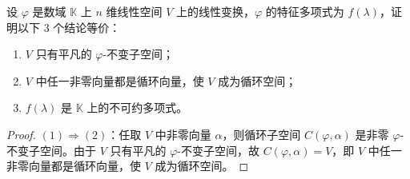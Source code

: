 \documentclass[../../main.tex]{subfiles}
\begin{document}
\begin{proposition}\label{proposition:特征多项式是不可约多项式的刻画}
设 $\varphi$ 是数域 $\mathbb{K}$ 上 $n$ 维线性空间 $V$ 上的线性变换，$\varphi$ 的特征多项式为 $f(\lambda)$，证明以下 3 个结论等价：
\begin{enumerate}[(1)]
\item $V$ 只有平凡的 $\varphi$-不变子空间；

\item $V$ 中任一非零向量都是循环向量，使 $V$ 成为循环空间；

\item $f(\lambda)$ 是 $\mathbb{K}$ 上的不可约多项式。
\end{enumerate}
\end{proposition}
\begin{proof}
$(1)\Rightarrow(2)$：任取 $V$ 中非零向量 $\alpha$，则循环子空间 $C(\varphi,\alpha)$ 是非零 $\varphi$-不变子空间。由于 $V$ 只有平凡的 $\varphi$-不变子空间，故 $C(\varphi,\alpha)=V$，即 $V$ 中任一非零向量都是循环向量，使 $V$ 成为循环空间。


\end{proof}
\end{document}
